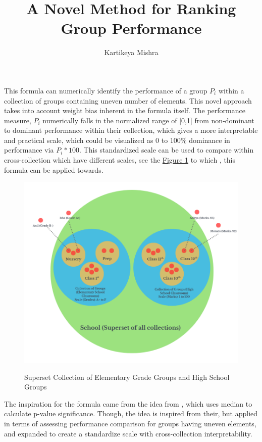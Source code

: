 \documentclass[man,floatsintext]{apa7}
\title{A \textsf{Novel} Method for Ranking Group Performance}
\author{Kartikeya Mishra}
\begin{document}
\maketitle
This formula can numerically identify the performance of a group $P_i$ within a collection of groups containing uneven number of elements. This novel approach takes into account weight bias inherent in the formula itself. The performance measure, $P_i$ numerically falls in the normalized range of [0,1] from non-dominant to dominant performance within their collection, which gives a more interpretable and practical scale, which could be visualized as 0 to 100\% dominance in performance via $P_i * 100$. 
This standardized scale can be used to compare within cross-collection which have different scales, see the \hyperref[fig:superset-collection]{Figure 1} to which , this formula can be applied towards.
\begin{figure}[!htb]
    \caption{Superset Collection of Elementary Grade Groups and High School Groups}
    \centering
    \includegraphics [scale=0.5]{images/superset_collection.png}
    \label{fig:superset-collection}
\end{figure}

The inspiration for the formula came from the idea from \cite{mann1947test}, which uses median to calculate p-value significance. Though, the idea is inspired from their, but applied in terms of assessing performance comparison
for groups having uneven elements, and expanded to create a standardize scale with cross-collection interpretability.
\end{document}
